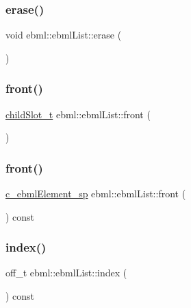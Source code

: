 \subsubsection{\texorpdfstring{erase()}{erase()}}
{\footnotesize\ttfamily void ebml\+::ebml\+List\+::erase (\begin{DoxyParamCaption}\item[{off\+\_\+t}]{ }\end{DoxyParamCaption})}

\mbox{\label{classebml_1_1ebmlList_a099cd0a5c21fb83a005638fa8990ae8c}} 
\subsubsection{\texorpdfstring{front()}{front()}\hspace{0.1cm}{\footnotesize\ttfamily [1/2]}}
{\footnotesize\ttfamily \mbox{\hyperlink{classebml_1_1childSlot__t}{child\+Slot\+\_\+t}} ebml\+::ebml\+List\+::front (\begin{DoxyParamCaption}{ }\end{DoxyParamCaption})}

\mbox{\label{classebml_1_1ebmlList_add75b2ad61fe9f997df303872adc67da}} 
\subsubsection{\texorpdfstring{front()}{front()}\hspace{0.1cm}{\footnotesize\ttfamily [2/2]}}
{\footnotesize\ttfamily \mbox{\hyperlink{namespaceebml_a2deef4e8071531b32e3533f1bf978917}{c\+\_\+ebml\+Element\+\_\+sp}} ebml\+::ebml\+List\+::front (\begin{DoxyParamCaption}{ }\end{DoxyParamCaption}) const}

\mbox{\label{classebml_1_1ebmlList_a2f680a149168b81adfb6e85b7af8e272}} 
\subsubsection{\texorpdfstring{index()}{index()}}
{\footnotesize\ttfamily off\+\_\+t ebml\+::ebml\+List\+::index (\begin{DoxyParamCaption}\item[{const \mbox{\hyperlink{namespaceebml_a2deef4e8071531b32e3533f1bf978917}{c\+\_\+ebml\+Element\+\_\+sp}} \&}]{ }\end{DoxyParamCaption}) const}

